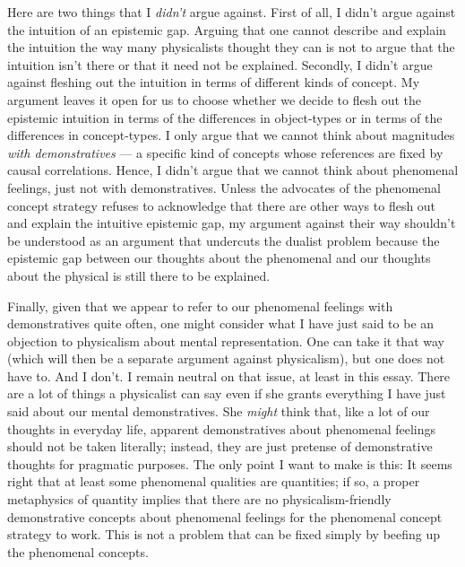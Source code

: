 \documentclass[a4paper,12pt]{article}
\begin{document}
Here are two things that I \emph{didn't} argue against. First of all, I didn't argue against the intuition of an epistemic gap. Arguing that one cannot describe and explain the intuition the way many physicalists thought they can is not to argue that the intuition isn't there or that it need not be explained. Secondly, I didn't argue against fleshing out the intuition in terms of different kinds of concept. My argument leaves it open for us to choose whether we decide to flesh out the epistemic intuition in terms of the differences in object-types or in terms of the differences in concept-types. I only argue that we cannot think about magnitudes \emph{with demonstratives} --- a specific kind of concepts whose references are fixed by causal correlations. Hence, I didn't argue that we cannot think about phenomenal feelings, just not with demonstratives. Unless the advocates of the phenomenal concept strategy refuses to acknowledge that there are other ways to flesh out and explain the intuitive epistemic gap, my argument against their way shouldn't be understood as an argument that undercuts the dualist problem because the epistemic gap between our thoughts about the phenomenal and our thoughts about the physical is still there to be explained.

Finally, given that we appear to refer to our phenomenal feelings with demonstratives quite often, one might consider what I have just said to be an objection to physicalism about mental representation. One can take it that way (which will then be a separate argument against physicalism), but one does not have to. And I don't. I remain neutral on that issue, at least in this essay. There are a lot of things a physicalist can say even if she grants everything I have just said about our mental demonstratives. She \emph{might} think that, like a lot of our thoughts in everyday life, apparent demonstratives about phenomenal feelings should not be taken literally; instead, they are just pretense of demonstrative thoughts for pragmatic purposes. The only point I want to make is this: It seems right that at least some phenomenal qualities are quantities; if so, a proper metaphysics of quantity implies that there are no physicalism-friendly demonstrative concepts about phenomenal feelings for the phenomenal concept strategy to work. This is not a problem that can be fixed simply by beefing up the phenomenal concepts.\footnotemark


\nocite{*}


\end{document}
